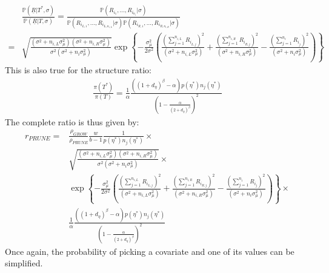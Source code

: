 \documentclass[11pt,a4paper]{article}
\newcommand{\vect}[1]{\underline{#1}}
\newcommand{\prob}{\mathbb{P}}
\begin{document}
\begin{equation}
    \label{eq:prune_likelihood_ratio}
    \begin{split}
          & \frac{\prob(\vect{R} | T^*, \sigma)}{\prob(\vect{R} | T, \sigma)} = \frac{\prob(R_{i_1}, ... , R_{i_{n_i}} | \sigma)}{\prob(R_{i_{L,1}}, ... , R_{i_{L,n_{i,L}}} | \sigma) \prob(R_{i_{R,1}}, ... , R_{i_{R,n_{i,R}}} | \sigma)}                                                                                                                                                                                                                         \\
        = & \sqrt{\frac{(\sigma^2 + n_{i,L}\sigma^2_\mu)(\sigma^2 + n_{i,R}\sigma^2_\mu)}{\sigma^2(\sigma^2 + n_i \sigma^2_\mu)}}\exp\left\{-\frac{\sigma_\mu^2}{2\sigma^2}\left(\frac{\left(\sum_{j=1}^{n_{i,L}}R_{i_{L,j}}\right)^2}{(\sigma^2 + n_{i,L}\sigma^2_\mu)} + \frac{\left(\sum_{j=1}^{n_{i,R}}R_{i_{R,j}}\right)^2}{(\sigma^2 + n_{i,R}\sigma^2_\mu) }-\frac{\left(\sum_{j=1}^{n_{i}}R_{i_{j}}\right)^2}{(\sigma^2 + n_{i}\sigma^2_\mu)}\right)\right\}
    \end{split}
\end{equation}
This is also true for the structure ratio:
\begin{equation}
    \label{eq:prune_struct_ratio}
    \begin{split}
        \frac{\pi(T^*)}{\pi(T)} = \frac{1}{\alpha} \frac{\left((1+d_\eta)^\beta - \alpha\right) p(\eta^*) n_j(\eta^*)}{\left(1 - \frac{\alpha}{(2 + d_{\eta})^\beta}\right)^2}
    \end{split}
\end{equation}
The complete ratio is thus given by:
\begin{equation}
    \label{eq:prune_ratio}
    \begin{split}
        r_{PRUNE} = & \frac{\rho_{GROW}}{\rho_{PRUNE}}\frac{w}{b-1}\frac{1}{p(\eta^*)n_j(\eta^*)} \times                                                           \\
                    & \sqrt{\frac{(\sigma^2 + n_{i,L}\sigma^2_\mu)(\sigma^2 + n_{i,R}\sigma^2_\mu)}{\sigma^2(\sigma^2 + n_i \sigma^2_\mu)}} \times                 \\ & \exp\left\{-\frac{\sigma_\mu^2}{2\sigma^2}\left(\frac{\left(\sum_{j=1}^{n_{i,L}}R_{i_{L,j}}\right)^2}{(\sigma^2 + n_{i,L}\sigma^2_\mu)} + \frac{\left(\sum_{j=1}^{n_{i,R}}R_{i_{R,j}}\right)^2}{(\sigma^2 + n_{i,R}\sigma^2_\mu) }-\frac{\left(\sum_{j=1}^{n_{i}}R_{i_{j}}\right)^2}{(\sigma^2 + n_{i}\sigma^2_\mu)}\right)\right\}\times \\
                    & \frac{1}{\alpha} \frac{\left((1+d_\eta)^\beta - \alpha\right) p(\eta^*) n_j(\eta^*)}{\left(1 - \frac{\alpha}{(2 + d_{\eta})^\beta}\right)^2}
    \end{split}
\end{equation}
Once again, the probability of picking a covariate and one of its values can be simplified.
\end{document}
